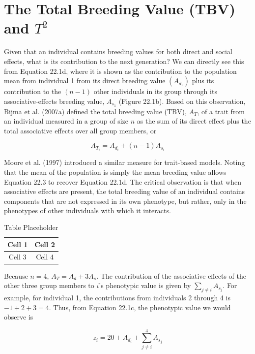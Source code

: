 \documentclass{article}
\begin{document}
\section{The Total Breeding Value (TBV) and  $ T^{2} $}
Given that an individual contains breeding values for both direct and social effects, what is its contribution to the next generation? We can directly see this from Equation 22.1d, where it is shown as the contribution to the population mean from individual 1 from its direct breeding value  $ (A_{d_1}) $ plus its contribution to the  $ (n-1) $ other individuals in its group through its associative-effects breeding value,  $ A_{s_1} $ (Figure 22.1b). Based on this observation, Bijma et al. (2007a) defined the total breeding value (TBV),  $ A_T $, of a trait from an individual measured in a group of size  $ n $ as the sum of its direct effect plus the total associative effects over all group members, or

\begin{equation}
A_{T_{i}}=A_{d_{i}}+(n-1)A_{s_{i}}
\tag{22.3}
\label{eq:22_3}
\end{equation}

Moore et al. (1997) introduced a similar measure for trait-based models. Noting that the mean of the population is simply the mean breeding value allows Equation 22.3 to recover Equation 22.1d. The critical observation is that when associative effects are present, the total breeding value of an individual contains components that are not expressed in its own phenotype, but rather, only in the phenotypes of other individuals with which it interacts.

\begin{table}[h]
\centering
\begin{tabular}{|c|c|}
\hline
Cell 1 & Cell 2 \\
\hline
Cell 3 & Cell 4 \\
\hline
\end{tabular}
\caption{Table Placeholder}
\end{table}

Because $n = 4$, $A_T = A_d + 3A_s$. The contribution of the associative effects of the other three group members to $i$'s phenotypic value is given by $\sum_{j\neq i} A_{s_j}$. For example, for individual 1, the contributions from individuals 2 through 4 is $-1 + 2 + 3 = 4$. Thus, from Equation 22.1c, the phenotypic value we would observe is

\begin{equation}
z_{i}=20+A_{d_{i}}+\sum_{j\neq i}^{4}A_{s_{j}}
\end{equation}
\end{document}

